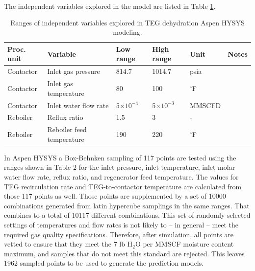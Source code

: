 \documentclass[11pt]{report}
\begin{document}
The independent variables explored in the model are listed in Table \ref{tab:TEG_Aspen_Variables}.

\begin{table}
\begin{scriptsize}
\caption{Ranges of independent variables explored in TEG dehydration Aspen HYSYS modeling.}
\label{tab:TEG_Aspen_Variables}
\begin{tabular*}{1\columnwidth}{p{}p{}p{}p{}p{}p{}}
\toprule
Proc. unit & Variable 				& Low range 	& High range 				& Unit 		& Notes \\
\midrule
Contactor &	Inlet gas pressure 		&	814.7 	& 1014.7				& psia	 	&\\
Contactor &	Inlet gas temperature 	&	80	 	&	100 				& $^\circ$F	 			& \\
Contactor &	Inlet water flow rate 		&	5$\times 10^{-4}$ 		& 5$\times 10^{-3}$  	& MMSCFD 	&\\
Reboiler 	&	Reflux ratio 			&	1.5		&	3 				& -				& \\
Reboiler 	&	Reboiler feed temperature &	190		&	220 				& $^\circ$F				& \\
\bottomrule
\end{tabular*}
\end{scriptsize}
\end{table}

In Aspen HYSYS a Box-Behnken sampling of 117 points are tested using the ranges shown in Table 2 for the inlet pressure, inlet temperature, inlet molar water flow rate, reflux ratio, and regenerator feed temperature. The values for TEG recirculation rate and TEG-to-contactor temperature are calculated from those 117 points as well. Those points are supplemented by a set of 10000 combinations generated from latin hypercube samplings in the same ranges. That combines to a total of 10117 different combinations. This set of randomly-selected settings of temperatures and flow rates is not likely to -- in general -- meet the required gas quality specifications. Therefore, after simulation, all points are vetted to ensure that they meet the 7 lb H$_2$O per MMSCF moisture content maximum, and samples that do not meet this standard are rejected. This leaves 1962 sampled points to be used to generate the prediction models. 
\end{document}
